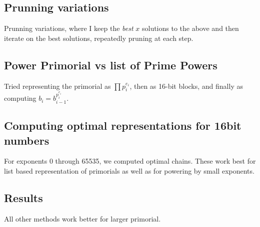 \documentclass[11pt, letterpaper]{article}
\theoremstyle{definition}
\begin{document}
\subsection{Prunning variations}
Prunning variations, where I keep the \emph{best} $x$ solutions to the above and then iterate on the best solutions, repeatedly pruning at each step.

\subsection{Power Primorial vs list of Prime Powers}
Tried representing the primorial as $\prod p_i^{e_i}$, then as 16-bit blocks, and finally as computing $b_i=b_{i-1}^{p_i^{e_i}}$.

\subsection{Computing optimal representations for 16bit numbers}
For exponents 0 through 65535, we computed optimal chains.  These work best for list based representation of primorials as well as for powering by small exponents.

\subsection{Results}
All other methods work better for larger primorial.
\end{document}
